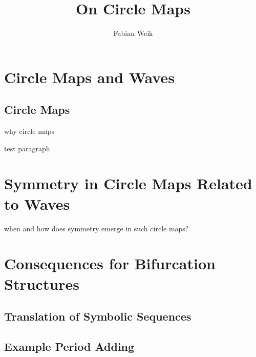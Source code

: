 \documentclass[10pt, twoside]{book}
\title{On Circle Maps}
\author{Fabian Weik}
\begin{document}
\maketitle

\tableofcontents

\chapter{Circle Maps and Waves}

\section{Circle Maps}

why circle maps

test paragraph

\chapter{Symmetry in Circle Maps Related to Waves}

when and how does symmetry emerge in such circle maps?

\chapter{Consequences for Bifurcation Structures}

\section{Translation of Symbolic Sequences}

\section{Example Period Adding}
\end{document}
